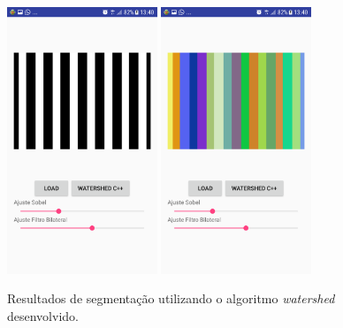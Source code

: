 \begin{figure}[!htb]
 \centering
 \def\baselinestretch{1}\small\normalsize
 \includegraphics[width=0.4\textwidth]{img/imagem_watershed_desenvolvido_app_n6.png}\qquad
 \includegraphics[width=0.4\textwidth]{img/resultado_watershed_desenvolvido_app_n6.png} 
 \caption{\label{fig:resultado_watershed_desenvolvido_app_p6}Resultados de segmentação utilizando o algoritmo \textit{watershed} desenvolvido.}
\end{figure}
